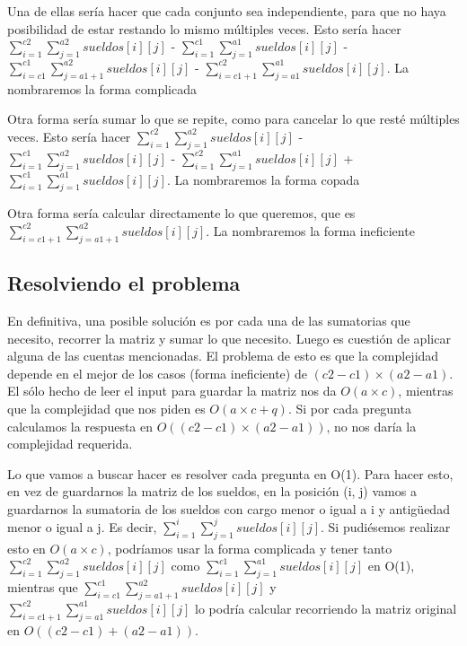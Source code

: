 Una de ellas sería hacer que cada conjunto sea independiente, para que no haya posibilidad de estar restando lo mismo múltiples veces. Esto sería hacer $\sum_{i = 1}^{c2} \sum_{j = 1}^{a2} sueldos[i][j]$ - $\sum_{i = 1}^{c1} \sum_{j = 1}^{a1} sueldos[i][j]$ - $\sum_{i = c1}^{c1} \sum_{j = a1 + 1}^{a2} sueldos[i][j]$ - $\sum_{i = c1 + 1}^{c2} \sum_{j = a1}^{a1} sueldos[i][j]$. La nombraremos la forma complicada  \newline

Otra forma sería sumar lo que se repite, como para cancelar lo que resté múltiples veces. Esto sería hacer $\sum_{i = 1}^{c2} \sum_{j = 1}^{a2} sueldos[i][j]$ - $\sum_{i = 1}^{c1} \sum_{j = 1}^{a2} sueldos[i][j]$ - $\sum_{i = 1}^{c2} \sum_{j = 1}^{a1} sueldos[i][j]$ + $\sum_{i = 1}^{c1} \sum_{j = 1}^{a1} sueldos[i][j]$. La nombraremos la forma copada  \newline

Otra forma sería calcular directamente lo que queremos, que es $\sum_{i = c1 + 1}^{c2} \sum_{j = a1 + 1}^{a2} sueldos[i][j]$. La nombraremos la forma ineficiente

\subsection{Resolviendo el problema}

En definitiva, una posible solución es por cada una de las sumatorias que necesito, recorrer la matriz y sumar lo que necesito. Luego es cuestión de aplicar alguna de las cuentas mencionadas. El problema de esto es que la complejidad depende en el mejor de los casos (forma ineficiente) de $(c2 - c1) \times (a2 - a1)$. El sólo hecho de leer el input para guardar la matriz nos da $O(a \times c)$, mientras que la complejidad que nos piden es $O(a \times c + q)$. Si por cada pregunta calculamos la respuesta en $O((c2 - c1) \times (a2 - a1))$, no nos daría la complejidad requerida.  \newline

Lo que vamos a buscar hacer es resolver cada pregunta en O(1). Para hacer esto, en vez de guardarnos la matriz de los sueldos, en la posición (i, j) vamos a guardarnos la sumatoria de los sueldos con cargo menor o igual a i y antigüedad menor o igual a j. Es decir, $\sum_{i = 1}^{i} \sum_{j = 1}^{j} sueldos[i][j]$. Si pudiésemos realizar esto en $O(a \times c)$, podríamos usar la forma complicada y tener tanto $\sum_{i = 1}^{c2} \sum_{j = 1}^{a2} sueldos[i][j]$ como $\sum_{i = 1}^{c1} \sum_{j = 1}^{a1} sueldos[i][j]$ en O(1), mientras que $\sum_{i = c1}^{c1} \sum_{j = a1 + 1}^{a2} sueldos[i][j]$ y $\sum_{i = c1 + 1}^{c2} \sum_{j = a1}^{a1} sueldos[i][j]$ lo podría calcular recorriendo la matriz original en $O((c2 - c1) + (a2 - a1))$.  \newline

